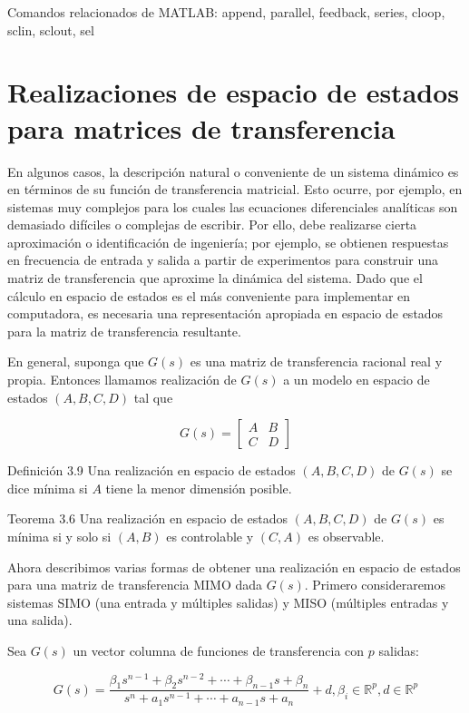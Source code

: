 Comandos relacionados de MATLAB: append, parallel, feedback, series, cloop, sclin, sclout, sel

\section{Realizaciones de espacio de estados para matrices de transferencia}
En algunos casos, la descripción natural o conveniente de un sistema dinámico es en términos de su función de transferencia matricial. Esto ocurre, por ejemplo, en sistemas muy complejos para los cuales las ecuaciones diferenciales analíticas son demasiado difíciles o complejas de escribir. Por ello, debe realizarse cierta aproximación o identificación de ingeniería; por ejemplo, se obtienen respuestas en frecuencia de entrada y salida a partir de experimentos para construir una matriz de transferencia que aproxime la dinámica del sistema. Dado que el cálculo en espacio de estados es el más conveniente para implementar en computadora, es necesaria una representación apropiada en espacio de estados para la matriz de transferencia resultante.

En general, suponga que $G(s)$ es una matriz de transferencia racional real y propia. Entonces llamamos realización de $G(s)$ a un modelo en espacio de estados $(A, B, C, D)$ tal que

$$
G(s)=\left[\begin{array}{c|c}
A & B \\
\hline C & D
\end{array}\right]
$$

Definición 3.9 Una realización en espacio de estados $(A, B, C, D)$ de $G(s)$ se dice mínima si $A$ tiene la menor dimensión posible.

Teorema 3.6 Una realización en espacio de estados $(A, B, C, D)$ de $G(s)$ es mínima si y solo si $(A, B)$ es controlable y $(C, A)$ es observable.

Ahora describimos varias formas de obtener una realización en espacio de estados para una matriz de transferencia MIMO dada $G(s)$. Primero consideraremos sistemas SIMO (una entrada y múltiples salidas) y MISO (múltiples entradas y una salida).

Sea $G(s)$ un vector columna de funciones de transferencia con $p$ salidas:

$$
G(s)=\frac{\beta_{1} s^{n-1}+\beta_{2} s^{n-2}+\cdots+\beta_{n-1} s+\beta_{n}}{s^{n}+a_{1} s^{n-1}+\cdots+a_{n-1} s+a_{n}}+d, \beta_{i} \in \mathbb{R}^{p}, d \in \mathbb{R}^{p}
$$

